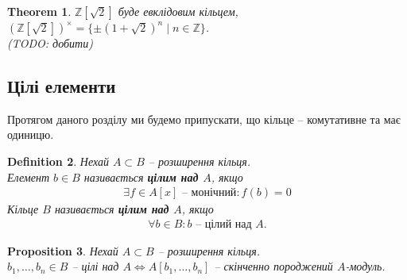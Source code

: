 \documentclass[a4paper, 10pt]{article}
\theoremstyle{theoremdd}
\newtheorem{theorem}{Theorem}[subsection]
\theoremstyle{theoremdd}
\newtheorem{definition}[theorem]{Definition}
\theoremstyle{theoremdd}
\theoremstyle{theoremdd}
\theoremstyle{theoremdd}
\theoremstyle{theoremdd}
\theoremstyle{theoremdd}
\theoremstyle{theoremdd}
\theoremstyle{theoremdd}
\newtheorem{proposition}[theorem]{Proposition}
\theoremstyle{theoremdd}
\theoremstyle{theoremdd}
\theoremstyle{theoremdd}
\theoremstyle{theoremdd}
\theoremstyle{theoremdd}
\theoremstyle{theoremdd}
\begin{document}
\begin{theorem}
$\mathbb{Z}[\sqrt{2}]$ буде евклідовим кільцем, $(\mathbb{Z}[\sqrt{2}])^\times = \{ \pm (1+\sqrt{2})^n \mid n \in \mathbb{Z} \}$.\\
(TODO: добити)
\end{theorem}

\subsection{Цілі елементи}
Протягом даного розділу ми будемо припускати, що кільце -- комутативне та має одиницю.

\begin{definition}
Нехай $A \subset B$ -- розширення кільця.\\
Елемент $b \in B$ називається \textbf{цілим над $A$}, якщо
\begin{align*}
\exists f \in A[x] \text{ -- монічний}: f(b) = 0
\end{align*}
Кільце $B$ називається \textbf{цілим над $A$}, якщо
\begin{align*}
\forall b \in B: b \text{ -- цілий над $A$.}
\end{align*}
\end{definition}

\begin{proposition}
Нехай $A \subset B$ -- розширення кільця.\\
$b_1,\dots,b_n \in B$ -- цілі над $A \iff A[b_1,\dots,b_n]$ -- скінченно породжений $A$-модуль. 
\end{proposition}
\end{document}
